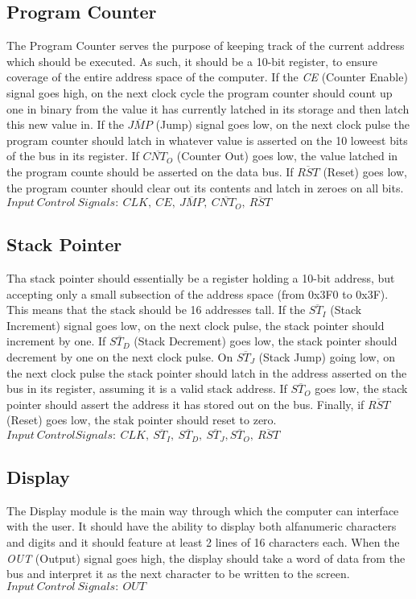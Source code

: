 \subsection{Program Counter} \label{pc}
The Program Counter serves the purpose of keeping track of the current address which should be executed. As such, it should
be a 10-bit register, to ensure coverage of the entire address space of the computer. If the \emph{CE} (Counter Enable) signal
goes high, on the next clock cycle the program counter should count up one in binary from the value it has currently latched
in its storage and then latch this new value in. If the \emph{$\overline{JMP}$} (Jump) signal goes low, on the next clock pulse the
program counter should latch in whatever value is asserted on the 10 loweest bits of the bus in its register. If
\emph{$\overline{CNT_O}$} (Counter Out) goes low, the value latched in the program counte should be asserted on the data bus.
If \emph{$\overline{RST}$} (Reset) goes low, the program counter should clear out its contents and latch in zeroes on all bits. \\
\textbf{$Input\:Control\:Signals:\:CLK,\:CE,\:\overline{JMP},\:\overline{CNT_O},\:\overline{RST}$}

\subsection{Stack Pointer} \label{stack-pointer}
Tha stack pointer should essentially be a register holding a 10-bit address, but accepting only a small subsection of the address
space (from 0x3F0 to 0x3F). This means that the stack should be 16 addresses tall. If the \emph{$\overline{ST_I}$} (Stack Increment)
signal goes low, on the next clock pulse, the stack pointer should increment by one. If \emph{$\overline{ST_D}$} (Stack Decrement)
goes low, the stack pointer should decrement by one on the next clock pulse.
On \emph{$\overline{ST_J}$} (Stack Jump) going low, on the next clock pulse the stack pointer should latch in the address asserted
on the bus in its register, assuming it is a valid stack address. If \emph{$\overline{ST_O}$} goes low, the stack pointer should
assert the address it has stored out on the bus. Finally, if \emph{$\overline{RST}$} (Reset) goes low, the stak pointer should reset
to zero. \\
\textbf{$Input\:Control Signals:\:CLK,\:\overline{ST_I},\:\overline{ST_D},\:\overline{ST_J}, \overline{ST_O},\:\overline{RST}$}

\subsection{Display} \label{display}
The Display module is the main way through which the computer can interface with the user. It should have the ability to display
both alfanumeric characters and digits and it should feature at least 2 lines of 16 characters each. When the \emph{OUT} (Output)
signal goes high, the display should take a word of data from the bus and interpret it as the next character to be written to the
screen. \\
\textbf{$Input\:Control\:Signals:\:OUT$}

